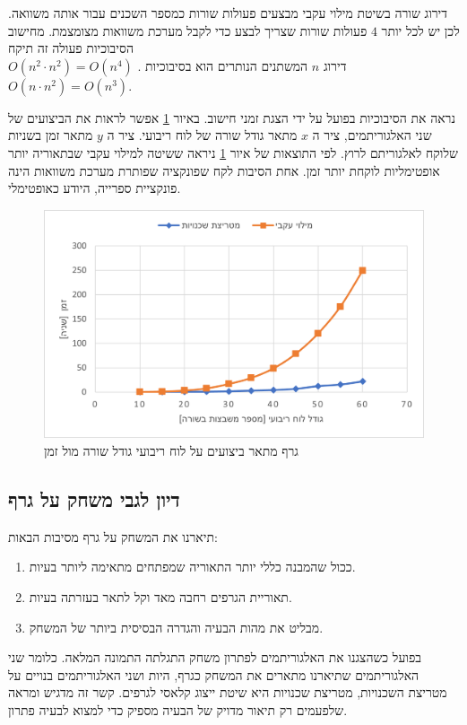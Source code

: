 \documentclass[12pt,leqno]{article}
\theoremstyle{theoremdd}
\begin{document}
דירוג שורה בשיטת מילוי עקבי 
מבצעים פעולות שורות כמספר השכנים עבור אותה משוואה.
לכן יש לכל יותר
$4$
פעולות שורות שצריך לבצע
כדי לקבל מערכת משוואות מצומצמת.
מחישוב הסיבוכיות 
פעולה  זה תיקח
\\
$O(n^2 \cdot n^2) = O(n^4)$
.
דירוג
$n$
המשתנים  
הנותרים
הוא בסיבוכיות 
$O(n \cdot n^2) = O (n^3)$.

נראה את הסיבוכיות בפועל על ידי הצגת זמני חישוב.
באיור 
\ref{fig:prefofmance_diagram}
אפשר לראות את הביצועים
של שני האלגוריתמים, ציר 
ה
$x$
מתאר
גודל שורה של לוח ריבועי.
ציר ה
$y$
מתאר
זמן 
בשניות
שלוקח לאלגוריתם לרוץ.
לפי התוצאות של איור 
\ref{fig:prefofmance_diagram}
ניראה 
ששיטה למילוי עקבי שבתאוריה יותר אופטימליות לוקחת יותר זמן.
אחת הסיבות לקח 
שפונקציה שפותרת מערכת משוואות הינה פונקציית ספרייה,
היודע כאופטימלי.

\begin{figure}[ht]
    \caption{ 
    גרף מתאר ביצועים על לוח ריבועי גודל שורה מול זמן
    }
    \label{fig:prefofmance_diagram}
    \centering
    \includegraphics{images/benchmark.png}
\end{figure}

\subsection{דיון לגבי משחק על גרף}
תיארנו את המשחק על גרף 
מסיבות הבאות:
\begin{enumerate}
    \item 
    ככול שהמבנה כללי יותר התאוריה שמפתחים מתאימה ליותר בעיות.
    \item 
    תאוריית הגרפים רחבה מאד וקל לתאר בעזרתה בעיות.
    \item 
    מבליט את מהות הבעיה והגדרה הבסיסית ביותר של המשחק.
\end{enumerate}
בפועל כשהצגנו את האלגוריתמים לפתרון משחק 
התגלתה התמונה המלאה.
כלומר
שני האלגוריתמים שתיארנו מתארים את המשחק כגרף,
היות ושני האלגוריתמים בנויים על מטריצת השכנויות,
מטריצת שכנויות היא שיטת ייצוג קלאסי לגרפים.
קשר זה מדגיש ומראה שלפעמים רק תיאור מדויק של הבעיה מספיק כדי למצוא לבעיה פתרון.
\end{document}
